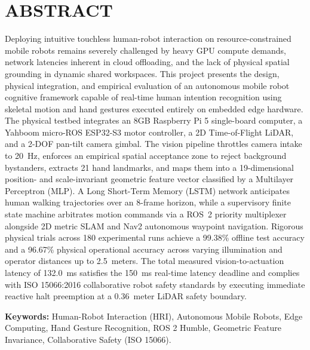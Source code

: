 \chapter*{ABSTRACT}

Deploying intuitive touchless human-robot interaction on resource-constrained mobile robots remains severely challenged by heavy GPU compute demands, network latencies inherent in cloud offloading, and the lack of physical spatial grounding in dynamic shared workspaces. This project presents the design, physical integration, and empirical evaluation of an autonomous mobile robot cognitive framework capable of real-time human intention recognition using skeletal motion and hand gestures executed entirely on embedded edge hardware. The physical testbed integrates an 8GB Raspberry Pi 5 single-board computer, a Yahboom micro-ROS ESP32-S3 motor controller, a 2D Time-of-Flight LiDAR, and a 2-DOF pan-tilt camera gimbal. The vision pipeline throttles camera intake to 20~Hz, enforces an empirical spatial acceptance zone to reject background bystanders, extracts 21 hand landmarks, and maps them into a 19-dimensional position- and scale-invariant geometric feature vector classified by a Multilayer Perceptron (MLP). A Long Short-Term Memory (LSTM) network anticipates human walking trajectories over an 8-frame horizon, while a supervisory finite state machine arbitrates motion commands via a ROS~2 priority multiplexer alongside 2D metric SLAM and Nav2 autonomous waypoint navigation. Rigorous physical trials across 180 experimental runs achieve a 99.38\% offline test accuracy and a 96.67\% physical operational accuracy across varying illumination and operator distances up to 2.5~meters. The total measured vision-to-actuation latency of 132.0~ms satisfies the 150~ms real-time latency deadline and complies with ISO 15066:2016 collaborative robot safety standards by executing immediate reactive halt preemption at a 0.36~meter LiDAR safety boundary.

\vspace{0.8cm}
\noindent\textbf{Keywords:} Human-Robot Interaction (HRI), Autonomous Mobile Robots, Edge Computing, Hand Gesture Recognition, ROS 2 Humble, Geometric Feature Invariance, Collaborative Safety (ISO 15066).
